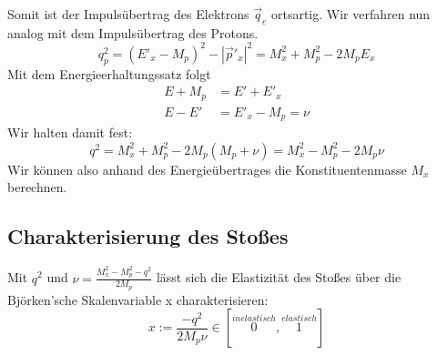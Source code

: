 \documentclass[Ex4_Zusammenfassung.tex]{subfiles}
\begin{document}
Somit ist der Impulsübertrag des Elektrons $\vec q_e$ ortsartig. Wir verfahren nun analog mit dem Impulsübertrag des Protons.
\begin{equation*}
q_p^2 = (E'_x-M_p)^2 - |\vec p'_x|^2 = M_x^2 + M_p^2 - 2 M_p E_x
\end{equation*}
Mit dem Energieerhaltungssatz folgt
\begin{align*}
E + M_p &= E' + E'_x \\
E -E' &= E'_x - M_p = \nu
\end{align*}
Wir halten damit fest:
\begin{equation}
q^2 = M_x^2 + M_p^2 - 2 M_p(M_p + \nu) = M_x^2 - M_p^2 - 2M_p \nu
\end{equation}
Wir können also anhand des Energieübertrages die Konstituentenmasse $M_x$ berechnen.
\subsection*{Charakterisierung des Stoßes}
Mit $q^2$ und $\nu= \frac{M_x^2-M_p^2-q^2}{2 M_p}$ lässt sich die Elastizität des Stoßes über die Björken'sche Skalenvariable x charakterisieren:
\begin{equation}
x := \frac{-q^2}{2 M_p \nu} \in [\stackrel{inelastisch}{0}, \stackrel{elastisch}{1}]
\end{equation}
\end{document}
